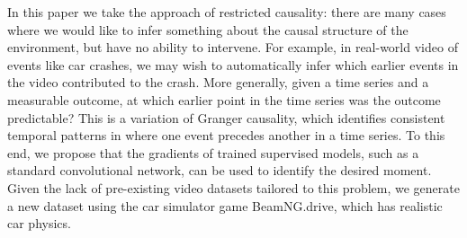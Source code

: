 \documentclass[letterpaper, twocolumn]{article} %
\begin{document}
In this paper we take the approach of restricted causality: there are many cases where we would like to infer something about the causal structure of the environment, but have no ability to intervene. For example, in real-world video of events like car crashes, we may wish to automatically infer which earlier events in the video contributed to the crash. More generally, given a time series and a measurable outcome, at which earlier point in the time series was the outcome predictable? This is a variation of Granger causality, which identifies consistent temporal patterns in where one event precedes another in a time series. To this end, we propose that the gradients of trained supervised models, such as a standard convolutional network, can be used to identify the desired moment. Given the lack of pre-existing video datasets tailored to this problem, we generate a new dataset using the car simulator game BeamNG.drive, which has realistic car physics. \\
\end{document}

